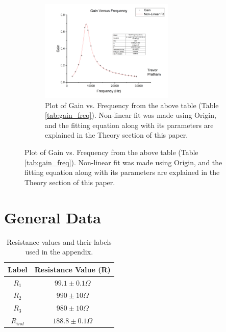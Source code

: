 \documentclass[12pt]{article}
\begin{document}
\begin{figure} [h]
    \begin{subfigure}
        \centering
        \includegraphics[width=0.7\textwidth]{figures/images/LCR_Gain-Frequency.png}
        \caption{Plot of Gain vs. Frequency from the above table (Table \ref{tab:gain_freq}). Non-linear fit was made using Origin, and the fitting equation along with its parameters are explained in the Theory section of this paper.}
        \label{fig:origin}
    \end{subfigure}
\end{figure}
\clearpage

\section{General Data}

\begin{table}[h]
\centering
\begin{tabular}{|c|c|}
\hline
\textbf{Label} & \textbf{Resistance Value (R)} \\
\hline
$R_1$  & $99.1 \pm 0.1\Omega$ \\
$R_2$  & $990 \pm 10\Omega$ \\
$R_3$  & $980 \pm 10\Omega$ \\
$R_{ind}$  & $188.8 \pm 0.1\Omega$ \\
\hline
\end{tabular}
\caption{Resistance values and their labels used in the appendix.}
\label{tab:resistance_values}
\end{table}
\end{document}
